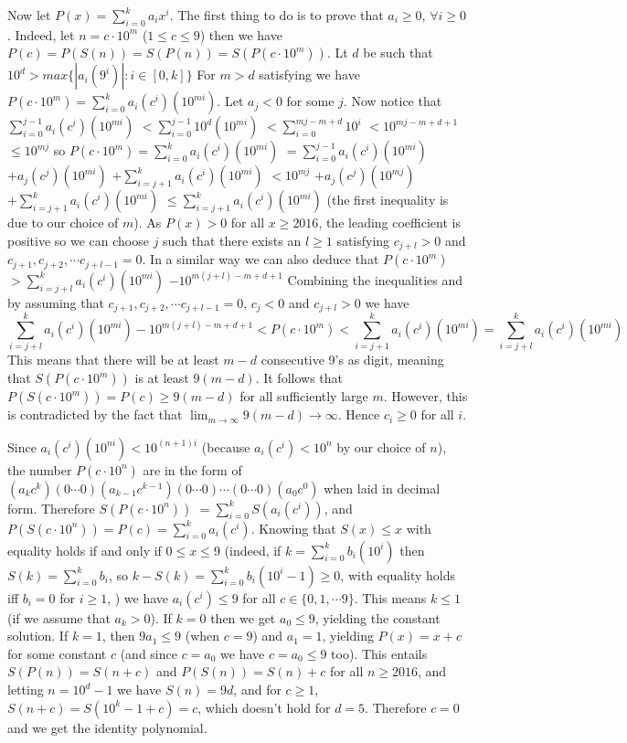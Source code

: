 \documentclass[11pt,a4paper]{article}
\begin{document}
\begin{itemize}
Now let $P(x)=\displaystyle\sum_{i=0}^k a_ix^i$. 
The first thing to do is to prove that $a_i\ge 0$, $\forall i\ge 0$. 
Indeed, let $n=c\cdot 10^m$ ($1\le c\le 9$) then we have 
$P(c)=P(S(n))=S(P(n))=S(P(c\cdot 10^m))$. 
Lt $d$ be such that 
$10^{d}>max\{|a_i(9^i)| : i\in [0, k]\}$
For $m>d$ satisfying we have 
$P(c\cdot 10^m)=\displaystyle\sum_{i=0}^k a_i (c^i)(10^{mi})$. 
Let $a_j<0$ for some $j$. 
Now notice that 
$\displaystyle\sum_{i=0}^{j-1} a_i (c^i)(10^{mi})$
$<\displaystyle\sum_{i=0}^{j-1} 10^{d}(10^{mi})$
$<\displaystyle\sum_{i=0}^{mj-m+d} 10^i$
$<10^{mj-m+d+1}$
$\le 10^{mj}$
so
$P(c\cdot 10^m)=\displaystyle\sum_{i=0}^k a_i (c^i)(10^{mi})$
$=\displaystyle\sum_{i=0}^{j-1} a_i (c^i)(10^{mi})$
$+a_j(c^j)(10^{mi})$
$+\displaystyle\sum_{i=j+1}^{k} a_i (c^i)(10^{mi})$
$<10^{mj}$
$+a_j(c^j)(10^{mj})$
$+\displaystyle\sum_{i=j+1}^{k} a_i (c^i)(10^{mi})$
$\le\displaystyle\sum_{i=j+1}^{k} a_i (c^i)(10^{mi})$
(the first inequality is due to our choice of $m$). 
As $P(x)>0$ for all $x\ge 2016$, the leading coefficient is positive so we can choose $j$ such that there exists an $l\ge 1$ satisfying 
$c_{j+l}>0$ and $c_{j+1}, c_{j+2}, \cdots c_{j+l-1}=0$. 
In a similar way we can also deduce that 
$P(c\cdot 10^m)$
$>\displaystyle\sum_{i=j+l}^{k} a_i (c^i)(10^{mi})$
$-10^{m(j+l)-m+d+1}$
Combining the inequalities and by assuming that $c_{j+1}, c_{j+2}, \cdots c_{j+l-1}=0$, $c_j<0$ and $c_{j+l}>0$ we have 
\[
\displaystyle\sum_{i=j+l}^{k} a_i (c^i)(10^{mi})
-10^{m(j+l)-m+d+1}
<P(c\cdot 10^m)
<\displaystyle\sum_{i=j+1}^{k} a_i (c^i)(10^{mi})
=\displaystyle\sum_{i=j+l}^{k} a_i (c^i)(10^{mi})\]
This means that there will be at least $m-d$ consecutive 9's as digit, meaning that $S(P(c\cdot 10^m))$ is at least $9(m-d)$. 
It follows that $P(S(c\cdot 10^m))=P(c)\ge 9(m-d)$ for all sufficiently large $m$. 
However, this is contradicted by the fact that $\lim_{m\to\infty}9(m-d)\to\infty$. 
Hence $c_i\ge 0$ for all $i$. 

Since $a_i (c^i)(10^{ni}) < 10^{(n+1)i}$ (because $a_i(c^i)<10^n$ by our choice of $n$), 
the number $P(c\cdot 10^n)$ are in the form of $(a_kc^k)(0\cdots 0) (a_{k-1}c^{k-1})(0\cdots 0)\cdots(0\cdots 0)(a_0c^0)$ when laid in decimal form. 
Therefore 
$S(P(c\cdot 10^n))$
$=\displaystyle\sum_{i=0}^k S(a_i (c^i))$, 
and 
$P(S(c\cdot 10^n))=P(c)=\displaystyle\sum_{i=0}^k a_i (c^i)$. 
Knowing that $S(x)\le x$ with equality holds if and only if $0\le x\le 9$ 
(indeed, if $k=\displaystyle\sum_{i=0}^k b_i(10^i)$ then $S(k)=\displaystyle\sum_{i=0}^k b_i$, 
so $k-S(k)=\displaystyle\sum_{i=0}^k b_i(10^i -1)\ge 0$, 
with equality holds iff $b_i=0$ for $i\ge 1$, )
we have $a_i(c^i)\le 9$ for all $c\in \{0,1,\cdots 9\}$. 
This means $k\le 1$ (if we assume that $a_k > 0$). 
If $k=0$ then we get $a_0\le 9$, yielding the constant solution. 
If $k=1$, then $9a_1\le 9$ (when $c=9$) and $a_1=1$, yielding $P(x)=x+c$ for some constant $c$ 
(and since $c=a_0$ we have $c=a_0\le 9$ too). 
This entails $S(P(n))=S(n+c)$ and $P(S(n))=S(n)+c$ for all $n\ge 2016$, 
and letting $n=10^d-1$ we have $S(n)=9d$, and for $c\ge 1$, $S(n+c)=S(10^k-1+c)=c$, which doesn't hold for $d=5$. 
Therefore $c=0$ and we get the identity polynomial. 



\end{itemize}
\end{document}

